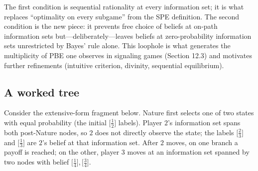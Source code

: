 The first condition is sequential rationality at every information set; it is what replaces ``optimality on every subgame'' from the SPE definition. The second condition is the new piece: it prevents free choice of beliefs at on-path information sets but---deliberately---leaves beliefs at zero-probability information sets unrestricted by Bayes' rule alone. This loophole is what generates the multiplicity of PBE one observes in signaling games (Section 12.3) and motivates further refinements (intuitive criterion, divinity, sequential equilibrium).


\subsection*{A worked tree}

Consider the extensive-form fragment below. Nature first selects one of two states with equal probability (the initial $\bigl[\tfrac{1}{2}\bigr]$ labels). Player $2$'s information set spans both post-Nature nodes, so $2$ does not directly observe the state; the labels $\bigl[\tfrac{2}{3}\bigr]$ and $\bigl[\tfrac{1}{3}\bigr]$ are $2$'s belief at that information set. After $2$ moves, on one branch a payoff is reached; on the other, player $3$ moves at an information set spanned by two nodes with belief $\bigl[\tfrac{1}{4}\bigr], \bigl[\tfrac{3}{4}\bigr]$.

